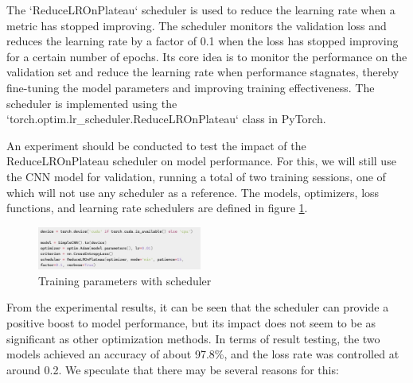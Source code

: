 \documentclass[twocolumn]{article}
\begin{document}
    The `ReduceLROnPlateau` scheduler is used to reduce the learning rate when a metric has stopped improving. The scheduler monitors the validation loss and reduces the learning rate by a factor of 0.1 when the loss has stopped improving for a certain number of epochs. Its core idea is to monitor the performance on the validation set and reduce the learning rate when performance stagnates, thereby fine-tuning the model parameters and improving training effectiveness. The scheduler is implemented using the `torch.optim.lr\_scheduler.ReduceLROnPlateau` class in PyTorch.

    An experiment should be conducted to test the impact of the ReduceLROnPlateau scheduler on model performance. For this, we will still use the CNN model for validation, running a total of two training sessions, one of which will not use any scheduler as a reference. The models, optimizers, loss functions, and learning rate schedulers are defined in figure \ref{fig:scheduler_train}.

    \begin{figure}
        \centering
        \includegraphics[width=0.48\textwidth]{scheduler_train.png}
        \caption{Training parameters with scheduler}
        \label{fig:scheduler_train}
    \end{figure}

    From the experimental results, it can be seen that the scheduler can provide a positive boost to model performance, but its impact does not seem to be as significant as other optimization methods. In terms of result testing, the two models achieved an accuracy of about 97.8\%, and the loss rate was controlled at around 0.2. We speculate that there may be several reasons for this:
\end{document}
